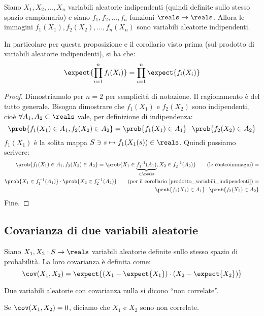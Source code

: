 \begin{prop}
Siano $X_1, X_2, \ldots, X_n$ variabili aleatorie indipendenti (quindi definite sullo stesso spazio campionario) e siano $f_1, f_2, \ldots, f_n$ funzioni $\reals \to \reals$. Allora le immagini $f_1(X_1), f_2(X_2), \ldots, f_n(X_n)$ sono variabili aleatorie indipendenti.
\end{prop}
In particolare per questa proposizione e il corollario visto prima (sul prodotto di variabili aleatorie indipendenti), si ha che:
\[
\expect{\prod_{i =1}^{n} f_i(X_i)} = \prod_{i = 1}^{n} \expect{f_i(X_i)}
\]
\begin{proof}
Dimostriamolo per $n = 2$ per semplicit\`a di notazione. Il ragionamento \`e del tutto generale. Bisogna dimostrare che $f_1 (X_1)$ e $f_2(X_2)$ sono indipendenti, cio\`e $\forall A_1, A_2 \subset \reals$ vale, per definizione di indipendenza:
\[
\prob{f_1(X_1) \in A_1, f_2(X_2) \in A_2} = \prob{f_1(X_1) \in A_1} \cdot \prob{f_2(X_2) \in A_2}
\]
$f_1(X_1)$ \`e la solita mappa $S \ni s \mapsto f_1(X_1(s)) \in \reals$. Quindi possiamo scrivere:
\begin{align*}
\prob{f_1(X_1) \in A_1, f_2(X_2) \in A_2} = 
\prob{X_1 \in \underbrace{f_1^{-1} (A_1)}_{\subset \reals}, X_2 \in f_2^{-1} (A_2)} \tag{le controimmagni} = \\
\prob{X_1 \in f_1^{-1} (A_1)} \cdot \prob{X_2 \in f_2^{-1} (A_2)} \tag{per il corollario \ref{prodotto_variabili_indipendenti}} = \\
\prob{f_1(X_1) \in A_1} \cdot \prob{f_2(X_2) \in A_2}
\end{align*}
Fine.
\end{proof}

\subsection{Covarianza di due variabili aleatorie}

\begin{defn}
Siano $X_1, X_2 : S \to \reals$ variabili aleatorie definite sullo stesso spazio di probabilit\`a. La loro covarianza \`e definita come:
\[
\cov (X_1, X_2) = \expect{ \left( X_1 - \expect{X_1} \right) \cdot \left( X_2 - \expect{X_2} \right) }
\]
\end{defn}
Due variabili aleatorie con covarianza nulla si dicono ``non correlate''.
\begin{defn}
Se $\cov(X_1,X_2) = 0$, diciamo che $X_1$ e $X_2$ sono non correlate.
\end{defn}

